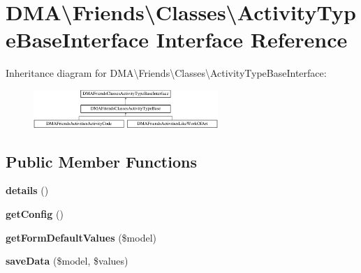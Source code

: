 \hypertarget{interfaceDMA_1_1Friends_1_1Classes_1_1ActivityTypeBaseInterface}{}\section{D\+M\+A\textbackslash{}Friends\textbackslash{}Classes\textbackslash{}Activity\+Type\+Base\+Interface Interface Reference}
\label{interfaceDMA_1_1Friends_1_1Classes_1_1ActivityTypeBaseInterface}
Inheritance diagram for D\+M\+A\textbackslash{}Friends\textbackslash{}Classes\textbackslash{}Activity\+Type\+Base\+Interface\+:\begin{figure}[H]
\begin{center}
\leavevmode
\includegraphics[height=1.418919cm]{db/d56/interfaceDMA_1_1Friends_1_1Classes_1_1ActivityTypeBaseInterface}
\end{center}
\end{figure}
\subsection*{Public Member Functions}
\begin{DoxyCompactItemize}
\item 
\hypertarget{interfaceDMA_1_1Friends_1_1Classes_1_1ActivityTypeBaseInterface_a9713aa0c2dcce44a56c2e0dc489b5ff3}{}{\bfseries details} ()\label{interfaceDMA_1_1Friends_1_1Classes_1_1ActivityTypeBaseInterface_a9713aa0c2dcce44a56c2e0dc489b5ff3}

\item 
\hypertarget{interfaceDMA_1_1Friends_1_1Classes_1_1ActivityTypeBaseInterface_ae1984840bbcdb6c60e009c3a0169c40d}{}{\bfseries get\+Config} ()\label{interfaceDMA_1_1Friends_1_1Classes_1_1ActivityTypeBaseInterface_ae1984840bbcdb6c60e009c3a0169c40d}

\item 
\hypertarget{interfaceDMA_1_1Friends_1_1Classes_1_1ActivityTypeBaseInterface_a805df9abe58a33ab5b9982275a935385}{}{\bfseries get\+Form\+Default\+Values} (\$model)\label{interfaceDMA_1_1Friends_1_1Classes_1_1ActivityTypeBaseInterface_a805df9abe58a33ab5b9982275a935385}

\item 
\hypertarget{interfaceDMA_1_1Friends_1_1Classes_1_1ActivityTypeBaseInterface_a0ac44f06880aa9cfcec9af2e81186aec}{}{\bfseries save\+Data} (\$model, \$values)\label{interfaceDMA_1_1Friends_1_1Classes_1_1ActivityTypeBaseInterface_a0ac44f06880aa9cfcec9af2e81186aec}

\end{DoxyCompactItemize}
